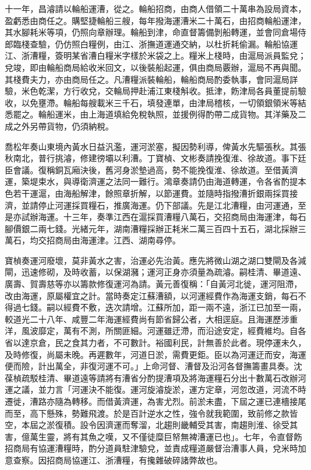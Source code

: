 \begin{pinyinscope}
十一年，昌濬請以輪船運漕，從之。輪船招商，由商人借領二十萬串為設局資本，盈虧悉由商任之。購堅捷輪船三艘，每年撥海運漕米二十萬石，由招商輪船運津，其水腳耗米等項，仍照向章辦理。輪船到津，命直督籌備剝船轉運，並會同倉場侍郎臨棧查驗，仍仿照白糧例，由江、浙撫道運通交納，以杜折耗偷漏。輪船協運江、浙漕糧，簽明某省漕白糧米字樣於米袋之上。糧米上棧時，由滬局派員監兌；兌竣，即由輪船商局給收米回文，以後裝船起運，俱由商局覈辦，滬局不再與聞。其棧費夫力，亦由商局任之。凡漕糧派裝輪船，輪船商局酌委執事，會同滬局詳驗，米色乾潔，方行收兌，交輪局押赴浦江東棧斛收。抵津，飭津局各員董提前驗收，以免壅滯。輪船每艘載米三千石，填發連單，由津局稽核，一切領銀領米等結悉罷之。輪船運米，由上海道填給免稅執照，並援例得酌帶二成貨物。其洋藥及二成之外另帶貨物，仍須納稅。

喬松年奏山東境內黃水日益汎濫，運河淤塞，擬因勢利導，俾黃水先驅張秋。其張秋南北，普行挑濬，修建徬壩以利漕。丁寶楨、文彬奏請挽復淮、徐故道。事下廷臣會議。復稱銅瓦廂決後，舊河身淤墊過高，勢不能挽復淮、徐故道。至借黃濟運，築堤束水，與導衛濟運之法同一難行。鴻章奏請仍由海道轉運，令各省酌提本色若干運滬，由海船解津，餘照章折解，以節運費。並隨時指撥漕折銀兩採買接濟，並請停止河運採買糧石，推廣海運。仍下部議。先是江北漕糧，由河運通，至是亦試辦海運。十三年，奏準江西在滬採買漕糧八萬石，交招商局由海運津，每石腳價銀二兩七錢。光緒元年，湖南漕糧採辦正耗米二萬三百四十五石，湖北採辦三萬石，均交招商局由海運津。江西、湖南尋停。

寶楨奏運河廢壞，莫非黃水之害，治運必先治黃。應先將微山湖之湖口雙閘及各減閘，迅速修砌，及時收蓄，以保湖瀦；運河正身亦須量為疏濬。嗣桂清、畢道遠、廣壽、賀壽慈等亦以籌款修復運河為請。黃元善復稱：「自黃河北徙，運河阻滯，改由海運，原屬權宜之計。當時奏定江蘇漕額，以河運經費作為海運支銷，每石不得過七錢。嗣以經費不敷，迭次請增。江蘇所加，距一兩不遠，浙江已加至一兩，較道光二十八年、咸豐二年海運經費尚有節省歸公者，大相逕庭。且海運歷涉重洋，風波靡定，萬有不測，所關匪細。河運雖迂滯，而沿途安定，經費維均。自各省以達京倉，民之食其力者，不可數計。裕國利民，計無善於此者。現停運未久，及時修復，尚屬未晚。再遲數年，河道日淤，需費更鉅。臣以為河運迂而安，海運便而險，計出萬全，非復河運不可。」上命河督、漕督及沿河各督撫籌畫具奏。沈葆楨疏駁桂清、畢道遠等請將有漕省分酌提漕項及將海運糧石分出十數萬石改辦河運之議，並力言「河運決不能復。運河旋濬旋淤，運方定章，河忽改道，河流不時遷徙，漕路亦隨為轉移。而借黃濟運，為害尤烈。前淤未盡，下屆之運已連檣接尾而至，高下懸殊，勢難飛渡。於是百計逆水之性，強令就我範圍，致前修之款皆空，本屆之淤復積。設令因濟運而奪溜，北趨則畿輔受其害，南趨則淮、徐受其害，億萬生靈，將有其魚之嘆，又不僅徒糜巨帑無裨漕運已也」。七年，令直督飭招商局有協運漕糧時，酌分道員駐津驗兌，並責成糧道嚴督治漕事人員，兌米時加意查察。因招商局協運江、浙漕糧，有攙雜破碎諸弊故也。


\end{pinyinscope}
